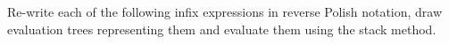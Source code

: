 \documentclass[a4paper, 12pt]{exam}
\begin{document}
\begin{questions}
\question
  Re-write each of the following infix expressions in reverse Polish notation, draw evaluation trees representing them and evaluate them using the stack method.

\end{questions}



\end{document}
